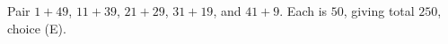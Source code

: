 Pair $1+49$, $11+39$, $21+29$, $31+19$, and $41+9$. Each is $50$, giving total $\boxed{250}$, choice (E).
